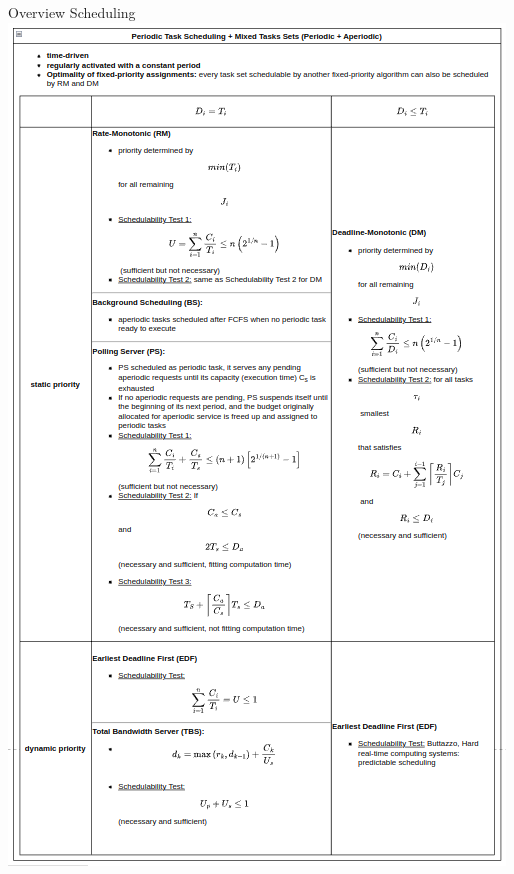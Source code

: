 \begin{frame}[allowframebreaks]{Overview Scheduling}
  \includegraphics[height=0.7\paperheight]{./figures/periodic_task_scheduling.png}


\end{frame}
